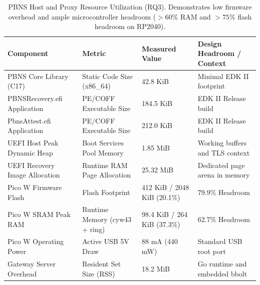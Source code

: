 \begin{table}[t]
\centering
\small
\caption{PBNS Host and Proxy Resource Utilization (RQ3). Demonstrates low firmware overhead and ample microcontroller headroom ($>60\%$ RAM and $>75\%$ flash headroom on RP2040).}
\label{tab:rq2-resources}
\begin{tabularx}{\textwidth}{llXl}
\toprule
\textbf{Component} & \textbf{Metric} & \textbf{Measured Value} & \textbf{Design Headroom / Context} \\
\midrule
PBNS Core Library (C17) & Static Code Size (x86\_64) & 42.8 KiB & Minimal EDK II footprint \\
PBNSRecovery.efi Application & PE/COFF Executable Size & 184.5 KiB & EDK II Release build \\
PbnsAttest.efi Application & PE/COFF Executable Size & 212.0 KiB & EDK II Release build \\
UEFI Host Peak Dynamic Heap & Boot Services Pool Memory & 1.85 MiB & Working buffers and TLS context \\
UEFI Recovery Image Allocation & Runtime RAM Page Allocation & 25.32 MiB & Dedicated page arena in memory \\
Pico W Firmware Flash & Flash Footprint & 412 KiB / 2048 KiB (20.1\%) & 79.9\% Headroom \\
Pico W SRAM Peak RAM & Runtime Memory (cyw43 + ring) & 98.4 KiB / 264 KiB (37.3\%) & 62.7\% Headroom \\
Pico W Operating Power & Active USB 5V Draw & 88 mA (440 mW) & Standard USB root port \\
Gateway Server Overhead & Resident Set Size (RSS) & 18.2 MiB & Go runtime and embedded bbolt \\
\bottomrule
\end{tabularx}
\end{table}
